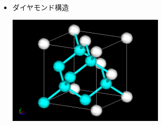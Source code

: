 \documentclass[12pt, dvipdfmx]{beamer}
\begin{document}
\begin{frame}
\begin{columns}[totalwidth=1\textwidth]
\begin{itemize}
				\item ダイヤモンド構造

				\includegraphics[width=0.6\textwidth]{dia.png}

			\end{itemize}
	\end{columns}
\end{frame}
\end{document}
